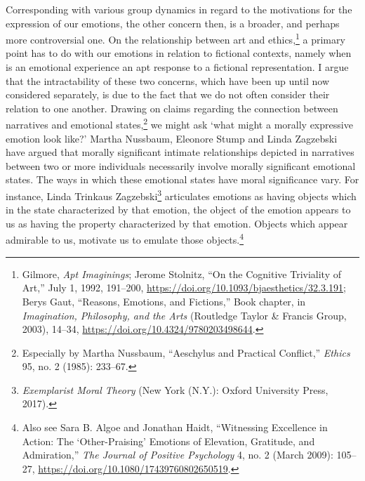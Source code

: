 \documentclass[phdthesis,12pt,final,a4paper]{wuthesis}
\theoremstyle{definition}
\theoremstyle{definition}
\theoremstyle{definition}
\theoremstyle{definition}
\theoremstyle{remark}
\begin{document}
Corresponding with various group dynamics in regard to the motivations for the expression of our emotions, the other concern then, is a broader, and perhaps more controversial one. On the relationship between art and ethics,\footnote{Gilmore, \emph{Apt {Imaginings}}; Jerome Stolnitz, {``On the {Cognitive Triviality} of {Art},''} July 1, 1992, 191--200, \url{https://doi.org/10.1093/bjaesthetics/32.3.191}; Berys Gaut, {``Reasons, Emotions, and Fictions,''} Book chapter, in \emph{Imagination, {Philosophy}, and the {Arts}} (Routledge Taylor \& Francis Group, 2003), 14--34, \url{https://doi.org/10.4324/9780203498644}.} a primary point has to do with our emotions in relation to fictional contexts, namely when is an emotional experience an apt response to a fictional representation. I argue that the intractability of these two concerns, which have been up until now considered separately, is due to the fact that we do not often consider their relation to one another. Drawing on claims regarding the connection between narratives and emotional states,\footnote{Especially by Martha Nussbaum, {``Aeschylus and Practical Conflict,''} \emph{Ethics} 95, no. 2 (1985): 233--67.} we might ask `what might a morally expressive emotion look like?' Martha Nussbaum, Eleonore Stump and Linda Zagzebski have argued that morally significant intimate relationships depicted in narratives between two or more individuals necessarily involve morally significant emotional states. The ways in which these emotional states have moral significance vary. For instance, Linda Trinkaus Zagzebski\footnote{\emph{Exemplarist {Moral Theory}} (New York (N.Y.): Oxford University Press, 2017).} articulates emotions as having objects which in the state characterized by that emotion, the object of the emotion appears to us as having the property characterized by that emotion. Objects which appear admirable to us, motivate us to emulate those objects.\footnote{Also see Sara B. Algoe and Jonathan Haidt, {``Witnessing Excellence in Action: The {`Other-Praising'} Emotions of Elevation, Gratitude, and Admiration,''} \emph{The Journal of Positive Psychology} 4, no. 2 (March 2009): 105--27, \url{https://doi.org/10.1080/17439760802650519}.}
\end{document}
